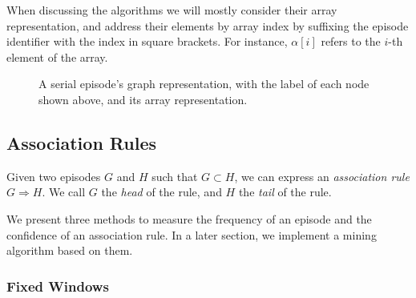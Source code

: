 When discussing the algorithms we will mostly consider their array representation, and address their elements by array index by suffixing the episode identifier with the index in square brackets. For instance, $ \alpha [i] $ refers to the $ i $-th element of the array.

\begin{figure}
\centering


\caption{A serial episode's graph representation, with the label of each node shown above, and its array representation.}
\label{fig:serial-representation}
\end{figure}

\subsection{Association Rules}
\begin{definition}
Given two episodes $ G $ and $ H $ such that $ G \subset H $, we can express an \emph{association rule} $ G \Rightarrow H $. We call $ G $ the \emph{head} of the rule, and $ H $ the \emph{tail} of the rule.
\end{definition}

We present three methods to measure the frequency of an episode and the confidence of an association rule. In a later section, we implement a mining algorithm based on them.

\subsubsection{Fixed Windows}

